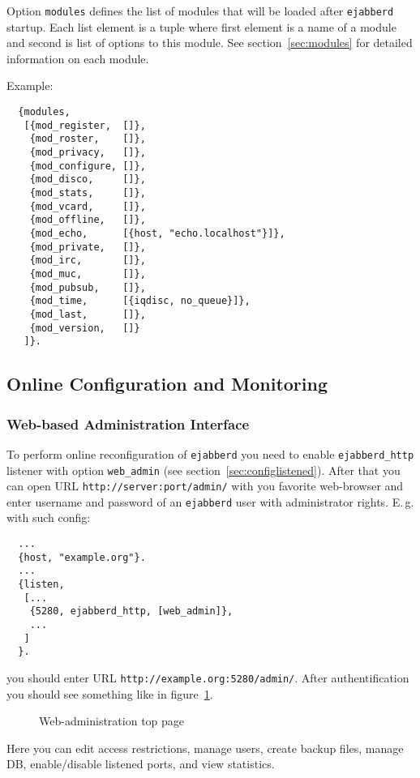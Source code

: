 \documentclass[a4paper,10pt]{article}
\newcommand{\imgscale}{0.58}
\newcommand{\insimg}[1]{\insscaleimg{\imgscale}{#1}}
\newcommand{\insscaleimg}[2]{
  \imgsrc{#2}{}
  \begin{latexonly}
    \scalebox{#1}{\texttt{[image: \#2]}}
  \end{latexonly}
}
\newcommand{\term}[1]{\texttt{#1}}
\newcommand{\ejabberd}{\texttt{ejabberd}}
\begin{document}
Option \term{modules} defines the list of modules that will be loaded after
\ejabberd{} startup.  Each list element is a tuple where first element is a
name of a module and second is list of options to this module.  See
section~\ref{sec:modules} for detailed information on each module.

Example:
\begin{verbatim}
  {modules,
   [{mod_register,  []},
    {mod_roster,    []},
    {mod_privacy,   []},
    {mod_configure, []},
    {mod_disco,     []},
    {mod_stats,     []},
    {mod_vcard,     []},
    {mod_offline,   []},
    {mod_echo,      [{host, "echo.localhost"}]},
    {mod_private,   []},
    {mod_irc,       []},
    {mod_muc,       []},
    {mod_pubsub,    []},
    {mod_time,      [{iqdisc, no_queue}]},
    {mod_last,      []},
    {mod_version,   []}
   ]}.
\end{verbatim}


\subsection{Online Configuration and Monitoring}
\label{sec:onlineconfig}

\subsubsection{Web-based Administration Interface}
\label{sec:webadm}

To perform online reconfiguration of \ejabberd{} you need to enable
\term{ejabberd\_http} listener with option \term{web\_admin} (see
section~\ref{sec:configlistened}).  After that you can open URL
\verb|http://server:port/admin/| with you favorite web-browser and enter
username and password of an \ejabberd{} user with administrator rights.  E.\,g.
with such config:
\begin{verbatim}
  ...
  {host, "example.org"}.
  ...
  {listen,
   [...
    {5280, ejabberd_http, [web_admin]},
    ...
   ]
  }.
\end{verbatim}
you should enter URL \verb|http://example.org:5280/admin/|.  After
authentification you should see something like in figure~\ref{fig:webadmmain}.
\begin{figure}[htbp]
  \centering
  \insimg{webadmmain.png}
  \caption{Web-administration top page}
  \label{fig:webadmmain}
\end{figure}
Here you can edit access restrictions, manage users, create backup files,
manage DB, enable/disable listened ports, and view statistics.
\end{document}
